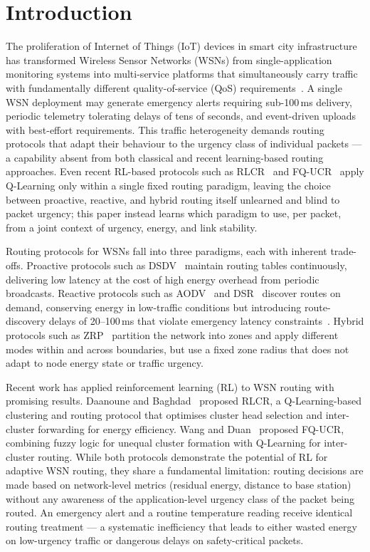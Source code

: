 \documentclass[12pt]{article}
\begin{document}
\section{Introduction}
\label{sec:introduction}

The proliferation of Internet of Things (IoT) devices in smart city
infrastructure has transformed Wireless Sensor Networks (WSNs) from
single-application monitoring systems into multi-service platforms
that simultaneously carry traffic with fundamentally different
quality-of-service (QoS) requirements~\cite{akyildiz2002,zohrabi2024}.
A single WSN deployment may generate emergency alerts requiring
sub-100\,ms delivery, periodic telemetry tolerating delays of tens
of seconds, and event-driven uploads with best-effort requirements.
This traffic heterogeneity demands routing protocols that adapt their behaviour to the urgency class of individual packets — a capability absent from both classical and recent learning-based routing approaches. Even recent RL-based protocols such as RLCR~\cite{daanoune_intelligent_2026} and FQ-UCR~\cite{wang_fqucr_2025} apply Q-Learning only within a single fixed routing paradigm, leaving the choice between proactive, reactive, and hybrid routing itself unlearned and blind to packet urgency; this paper instead learns which paradigm to use, per packet, from a joint context of urgency, energy, and link stability.

Routing protocols for WSNs fall into three paradigms, each with
inherent trade-offs. Proactive protocols such as DSDV~\cite{perkins1994}
maintain routing tables continuously, delivering low latency at the
cost of high energy overhead from periodic broadcasts. Reactive protocols such as AODV~\cite{perkins1999} and DSR~\cite{johnson1996} discover routes on
demand,
conserving energy in low-traffic conditions but introducing
route-discovery delays of 20--100\,ms that violate emergency latency
constraints~\cite{selim_manet_2025}. Hybrid protocols such as
ZRP~\cite{haas2001} partition the network into zones and apply
different modes within and across boundaries, but use a fixed zone
radius that does not adapt to node energy state or traffic urgency.

Recent work has applied reinforcement learning (RL) to WSN routing
with promising results. Daanoune and Baghdad~\cite{daanoune_intelligent_2026}
proposed RLCR, a Q-Learning-based clustering and routing protocol
that optimises cluster head selection and inter-cluster forwarding
for energy efficiency. Wang and Duan~\cite{wang_fqucr_2025} proposed
FQ-UCR, combining fuzzy logic for unequal cluster formation with
Q-Learning for inter-cluster routing. While both protocols
demonstrate the potential of RL for adaptive WSN routing, they share
a fundamental limitation: routing decisions are made based on
network-level metrics (residual energy, distance to base station)
without any awareness of the application-level urgency class of
the packet being routed. An emergency alert and a routine temperature
reading receive identical routing treatment --- a systematic
inefficiency that leads to either wasted energy on low-urgency
traffic or dangerous delays on safety-critical packets.
\end{document}
